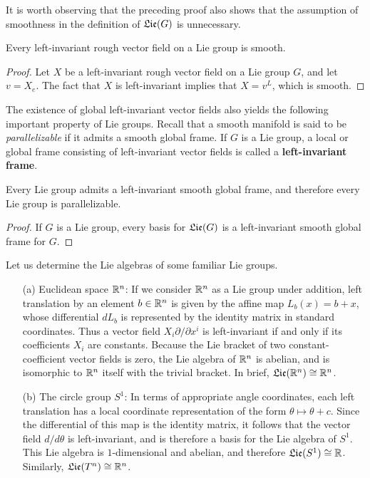 It is worth observing that the preceding proof also shows that the assumption of smoothness in the definition of $\mathfrak{Lie}(G)$ is unnecessary.
\begin{corollary}\label{Lie rough left-inv}
Every left-invariant rough vector field on a Lie group is smooth.
\end{corollary}
\begin{proof}
Let $X$ be a left-invariant rough vector field on a Lie group $G$, and let $v=X_e$. The fact that $X$ is left-invariant implies that $X=v^L$, which is smooth.
\end{proof}
The existence of global left-invariant vector fields also yields the following important property of Lie groups. Recall that a smooth manifold is said to be \textit{parallelizable} if it admits a smooth global frame. If $G$ is a Lie group, a local or global frame consisting of left-invariant vector fields is called a \textbf{left-invariant frame}.
\begin{corollary}\label{Lie group parallelizable}
Every Lie group admits a left-invariant smooth global frame, and therefore every Lie group is parallelizable.
\end{corollary}
\begin{proof}
If $G$ is a Lie group, every basis for $\mathfrak{Lie}(G)$ is a left-invariant smooth global frame for $G$.
\end{proof}
\begin{example}
Let us determine the Lie algebras of some familiar Lie groups.
\begin{itemize}
\item[(a)] Euclidean space $\mathbb{R}^n$: If we consider $\mathbb{R}^n$ as a Lie group under addition, left translation by an element $b\in\mathbb{R}^n$ is given by the affine map $L_b(x)=b+x$, whose differential $dL_b$ is represented by the identity matrix in standard coordinates. Thus a vector field $X_i\partial/\partial x^i$ is left-invariant if and only if its coefficients $X_i$ are constants. Because the Lie bracket of two constant-coefficient vector fields is zero, the Lie algebra of $\mathbb{R}^n$ is abelian, and is isomorphic to $\mathbb{R}^n$ itself with the trivial bracket. In brief, $\mathfrak{Lie}(\mathbb{R}^n)\cong\mathbb{R}^n$.
\item[(b)] The circle group $S^1$: In terms of appropriate angle coordinates, each left translation has a local coordinate representation of the form $\theta\mapsto\theta+c$. Since the differential of this map is the identity matrix, it follows that the vector field $d/d\theta$ is left-invariant, and is therefore a basis for the Lie algebra of $S^1$. This Lie algebra is $1$-dimensional and abelian, and therefore $\mathfrak{Lie}(S^1)\cong\mathbb{R}$. Similarly, $\mathfrak{Lie}(T^n)\cong\mathbb{R}^n$.
\end{itemize}
\end{example}
